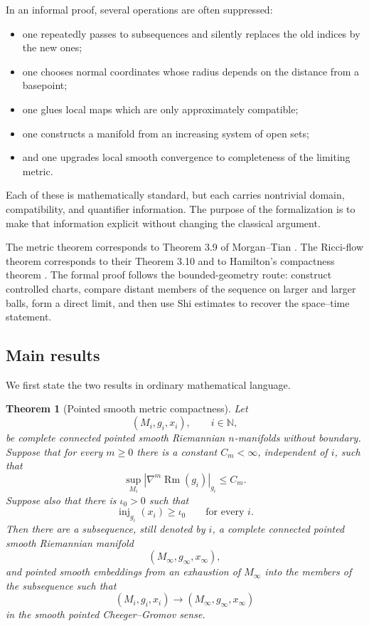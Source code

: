 \documentclass[11pt]{article}
\theoremstyle{plain}
\newtheorem{theorem}{Theorem}[section]
\theoremstyle{definition}
\theoremstyle{remark}
\newcommand{\Rm}{\operatorname{Rm}}
\newcommand{\inj}{\operatorname{inj}}
\newcommand{\N}{\mathbb N}
\newcommand{\norm}[1]{\left|#1\right|}
\begin{document}
In an informal proof, several operations are often suppressed:
\begin{itemize}[leftmargin=2em]
  \item one repeatedly passes to subsequences and silently replaces the old
  indices by the new ones;
  \item one chooses normal coordinates whose radius depends on the distance
  from a basepoint;
  \item one glues local maps which are only approximately compatible;
  \item one constructs a manifold from an increasing system of open sets;
  \item and one upgrades local smooth convergence to completeness of the
  limiting metric.
\end{itemize}
Each of these is mathematically standard, but each carries nontrivial domain,
compatibility, and quantifier information.  The purpose of the formalization
is to make that information explicit without changing the classical
argument.

The metric theorem corresponds to Theorem 3.9 of
Morgan--Tian \cite{MR2274812}.  The Ricci-flow theorem corresponds to their
Theorem 3.10 and to Hamilton's compactness theorem
\cite{HamiltonCompactness}.  The formal proof follows the bounded-geometry
route: construct controlled charts, compare distant members of the sequence
on larger and larger balls, form a direct limit, and then use Shi estimates
\cite{Shi1989a} to recover the space--time statement.

\subsection{Main results}

We first state the two results in ordinary mathematical language.

\begin{theorem}[Pointed smooth metric compactness]\label{thm:metric}
Let
\[
  (M_i,g_i,x_i),\qquad i\in\N,
\]
be complete connected pointed smooth Riemannian \(n\)-manifolds without
boundary.  Suppose that for every \(m\geq 0\) there is a constant
\(C_m<\infty\), independent of \(i\), such that
\[
  \sup_{M_i}\norm{\nabla^m\Rm(g_i)}_{g_i}\leq C_m.
\]
Suppose also that there is \(\iota_0>0\) such that
\[
  \inj_{g_i}(x_i)\geq \iota_0
  \qquad\text{for every }i.
\]
Then there are a subsequence, still denoted by \(i\), a complete connected
pointed smooth Riemannian manifold
\[
  (M_\infty,g_\infty,x_\infty),
\]
and pointed smooth embeddings from an exhaustion of \(M_\infty\) into the
members of the subsequence such that
\[
  (M_i,g_i,x_i)\longrightarrow
  (M_\infty,g_\infty,x_\infty)
\]
in the smooth pointed Cheeger--Gromov sense.
\end{theorem}
\end{document}
